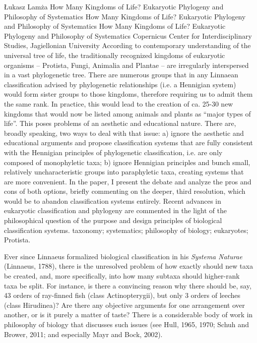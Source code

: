 \begin{artengenv}
	{Łukasz Lamża}
	{How Many Kingdoms of Life? Eukaryotic Phylogeny and Philosophy of Systematics}
	{How Many Kingdoms of Life? Eukaryotic Phylogeny and Philosophy of Systematics}
	{How Many Kingdoms of Life? Eukaryotic Phylogeny and Philosophy of Systematics}
	{Copernicus Center for Interdisciplinary Studies, Jagiellonian University}
	{According to contemporary understanding of the universal tree of life, the traditionally recognized kingdoms of
		eukaryotic organisms – Protista, Fungi, Animalia and Plantae – are irregularly interspersed in a vast phylogenetic
		tree. There are numerous groups that in any Linnaean classification advised by phylogenetic relationships (i.e. a
		Hennigian system) would form sister groups to those kingdoms, therefore requiring us to admit them the same rank. In
		practice, this would lead to the creation of ca. 25-30 new kingdoms that would now be listed among animals and plants
		as “major types of life”. This poses problems of an aesthetic and educational nature. There are, broadly speaking, two
		ways to deal with that issue: a) ignore the aesthetic and educational arguments and propose classification systems that
		are fully consistent with the Hennigian principles of phylogenetic classification, i.e. are only composed of
		monophyletic taxa; b) ignore Hennigian principles and bunch small, relatively uncharacteristic groups into paraphyletic
		taxa, creating systems that are more convenient. In the paper, I present the debate and analyze the pros and cons of
		both options, briefly commenting on the deeper, third resolution, which would be to abandon classification systems
		entirely. Recent advances in eukaryotic classification and phylogeny are commented in the light of the philosophical
		question of the purpose and design principles of biological classification systems.}
	{taxonomy; systematics; philosophy of biology; eukaryotes; Protista.}



\lettrine[loversize=0.13,lines=2,lraise=-0.05,nindent=0em,findent=0.2pt]%
{E}{}ver since Linnaeus formalized biological classification in his \textit{Systema Naturae}
\label{ref:RNDRPHrvYOnL2}(Linnaeus, 1788), there is the unresolved problem of how exactly should new taxa be created,
and, more specifically, into how many subtaxa should higher-rank taxa be split. For instance, is there a convincing
reason why there should be, say, 43 orders of ray-finned fish (class Actinopterygii), but only 3 orders of leeches
(class Hirudinea)? Are there any objective arguments for one arrangement over another, or is it purely a matter of
taste? There is a considerable body of work in philosophy of biology that discusses such issues
\label{ref:RNDfhQVj97gMS}(see Hull, 1965, 1970; Schuh and Brower, 2011; and especially Mayr and Bock, 2002).


\end{artengenv}
